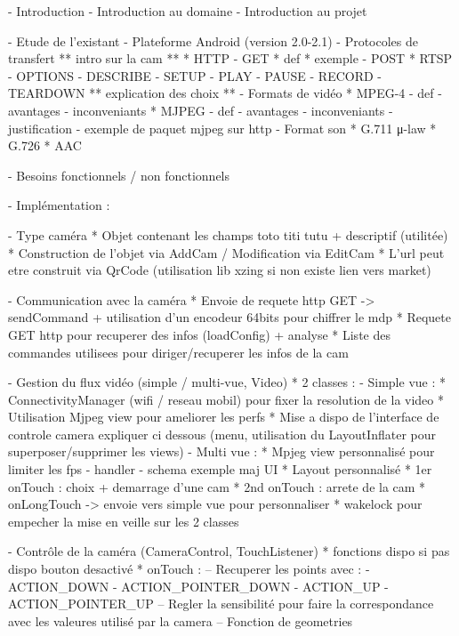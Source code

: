 - Introduction
  - Introduction au domaine
  - Introduction au projet

- Etude de l'existant
  - Plateforme Android (version 2.0-2.1)
  - Protocoles de transfert
    ** intro sur la cam **
    * HTTP
      - GET
       * def
       * exemple
      - POST
    * RTSP
      - OPTIONS
      - DESCRIBE
      - SETUP
      - PLAY
      - PAUSE
      - RECORD
      - TEARDOWN
     ** explication des choix **
  - Formats de vidéo
     * MPEG-4
      - def
      - avantages
      - inconveniants
     * MJPEG
      - def
      - avantages
      - inconveniants
      - justification
      - exemple de paquet mjpeg sur http      
  - Format son
     * G.711 μ-law
     * G.726
     * AAC
     
  

- Besoins fonctionnels / non fonctionnels


- Implémentation :

  - Type caméra 
    * Objet contenant les champs toto titi tutu + descriptif (utilitée)
    * Construction de l'objet via AddCam / Modification via EditCam
    * L'url peut etre construit via QrCode (utilisation lib xzing si non existe
    lien vers market)
    
  - Communication avec la caméra
    * Envoie de requete http GET -> sendCommand + utilisation d'un encodeur
      64bits pour chiffrer le mdp
    * Requete GET http pour recuperer des infos (loadConfig) + analyse
    * Liste des commandes utilisees pour diriger/recuperer les infos de la cam 
    
  - Gestion du flux vidéo (simple / multi-vue, Video)
    * 2 classes : 
        - Simple vue :
            * ConnectivityManager (wifi / reseau mobil) pour fixer la
              resolution de la video 
            * Utilisation Mjpeg view pour ameliorer les perfs
            * Mise a dispo de l'interface de controle camera expliquer ci
              dessous (menu, utilisation du LayoutInflater pour
              superposer/supprimer les views)
         - Multi vue : 
            * Mpjeg view personnalisé pour limiter les fps
               - handler 
               - schema exemple maj UI
            * Layout personnalisé
            * 1er onTouch : choix + demarrage d'une cam
            * 2nd onTouch : arrete de la cam
            * onLongTouch -> envoie vers simple vue pour personnaliser
    * wakelock pour empecher la mise en veille sur les 2 classes
    
  - Contrôle de la caméra (CameraControl, TouchListener)
    * fonctions dispo si pas dispo bouton desactivé
    * onTouch : 
        -- Recuperer les points avec : 
         - ACTION_DOWN
         - ACTION_POINTER_DOWN
         - ACTION_UP
         - ACTION_POINTER_UP
        -- Regler la sensibilité pour faire la correspondance avec les valeures
           utilisé par la camera
        -- Fonction de geometries   
    

